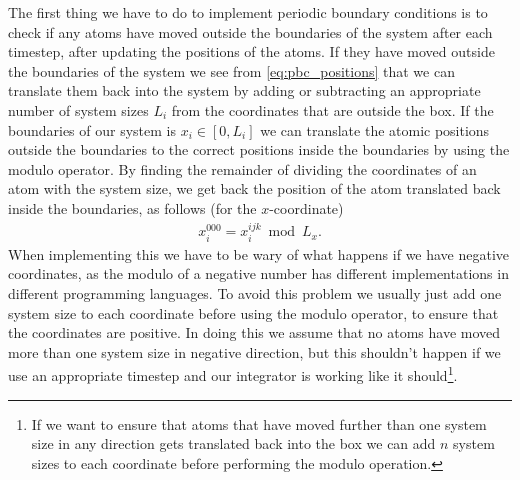 The first thing we have to do to implement periodic boundary conditions is to check if any atoms have moved outside the boundaries of the system after each timestep, after updating the positions of the atoms. If they have moved outside the boundaries of the system we see from \cref{eq:pbc_positions} that we can translate them back into the system by adding or subtracting an appropriate number of system sizes $L_i$ from the coordinates that are outside the box. If the boundaries of our system is $x_i \in [0, L_i]$ we can translate the atomic positions outside the boundaries to the correct positions inside the boundaries by using the modulo operator. By finding the remainder of dividing the coordinates of an atom with the system size, we get back the position of the atom translated back inside the boundaries, as follows (for the $x$-coordinate)
\begin{align*}
    x_i^{000} = x_i^{ijk} \bmod L_x.
\end{align*}
When implementing this we have to be wary of what happens if we have negative coordinates, as the modulo of a negative number has different implementations in different programming languages. To avoid this problem we usually just add one system size to each coordinate before using the modulo operator, to ensure that the coordinates are positive. In doing this we assume that no atoms have moved more than one system size in negative direction, but this shouldn't happen if we use an appropriate timestep and our integrator is working like it should\footnote{If we want to ensure that atoms that have moved further than one system size in any direction gets translated back into the box we can add $n$ system sizes to each coordinate before performing the modulo operation.}. 

